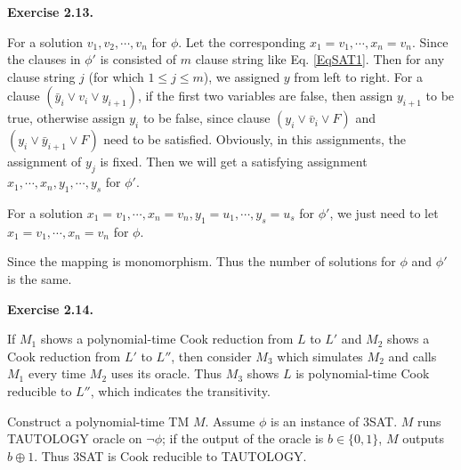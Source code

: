 \documentclass[a4paper]{article}
\newenvironment{exercise}[1]{
	\par
	\noindent\textbf{Exercise #1.}\quad
}{
	\par
	\bigskip
}
\newcommand{\bin}{\{0,1\}}
\begin{document}
\begin{exercise}{2.13}
\begin{itemize}
For a solution $v_{1}, v_{2}, \cdots, v_{n}$ for $\phi$. Let the corresponding $x_{1} = v_{1},\cdots, x_{n} = v_{n}$. Since the clauses in $\phi'$ is consisted of $m$ clause string like Eq. \eqref{EqSAT1}. Then for any clause string $j$ (for which $1
\leq j \leq m$), we assigned $y$ from left to right. For a clause $(\bar{y}_{i}\vee v_{i} \vee y_{i+1})$, if the first two variables are false, then assign $y_{i+1}$ to be true, otherwise assign $y_{i}$ to be false, since clause $(y_{i}\vee \bar{v}_{i} \vee F)$ and $({y}_{i}\vee \bar{y}_{i+1} \vee F)$ need to be satisfied. Obviously, in this assignments, the assignment of $y_{j}$ is fixed. Then we will get a satisfying assignment $x_{1},\cdots, x_{n}, y_{1},\cdots, y_{s}$ for $\phi'$.

For a solution $x_{1} = v_{1},\cdots, x_{n}= v_{n}, y_{1}=u_{1},\cdots, y_{s}= u_{s}$ for $\phi'$, we just need to let $x_{1} = v_{1},\cdots, x_{n}= v_{n}$ for $\phi$.

Since the mapping is monomorphism. Thus the number of solutions for $\phi$ and $\phi'$ is the same.
\end{itemize} 
\end{exercise}

    \begin{exercise}{2.14}
        If $M_1$ shows a polynomial-time Cook reduction from $L$ to $L'$ and $M_2$ shows a Cook reduction from $L'$ to $L''$,
        then consider $M_3$ which simulates $M_2$ and calls $M_1$ every time $M_2$ uses its oracle. Thus $M_3$ shows 
        $L$ is polynomial-time Cook reducible to $L''$, which indicates the transitivity.

        Construct a polynomial-time TM $M$. Assume $\phi$ is an instance of 3SAT. 
        $M$ runs TAUTOLOGY oracle on $\neg\phi$; if the output of the oracle is $b\in\bin$, $M$ outputs $b\oplus 1$.
        Thus 3SAT is Cook reducible to TAUTOLOGY.
    \end{exercise}
	
\end{document}
